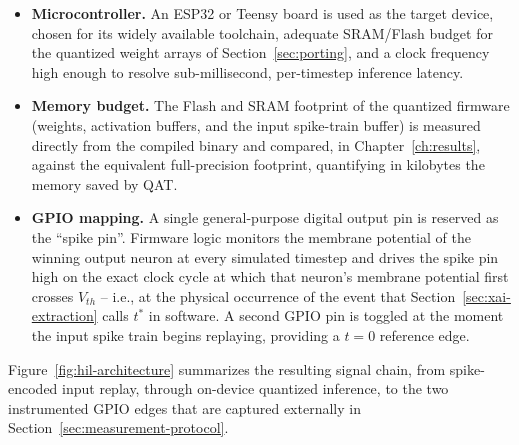 \begin{itemize}
    \item \textbf{Microcontroller.} An ESP32 or Teensy board is used as the target device, chosen for its widely available toolchain, adequate SRAM/Flash budget for the quantized weight arrays of Section~\ref{sec:porting}, and a clock frequency high enough to resolve sub-millisecond, per-timestep inference latency.
    \item \textbf{Memory budget.} The Flash and SRAM footprint of the quantized firmware (weights, activation buffers, and the input spike-train buffer) is measured directly from the compiled binary and compared, in Chapter~\ref{ch:results}, against the equivalent full-precision footprint, quantifying in kilobytes the memory saved by QAT.
    \item \textbf{GPIO mapping.} A single general-purpose digital output pin is reserved as the ``spike pin''. Firmware logic monitors the membrane potential of the winning output neuron at every simulated timestep and drives the spike pin high on the exact clock cycle at which that neuron's membrane potential first crosses $V_{th}$ -- i.e., at the physical occurrence of the event that Section~\ref{sec:xai-extraction} calls $t^{*}$ in software. A second GPIO pin is toggled at the moment the input spike train begins replaying, providing a $t=0$ reference edge.
\end{itemize}

Figure~\ref{fig:hil-architecture} summarizes the resulting signal chain, from spike-encoded input replay, through on-device quantized inference, to the two instrumented GPIO edges that are captured externally in Section~\ref{sec:measurement-protocol}.

